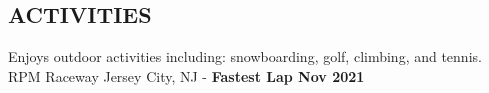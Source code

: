 \documentclass[margin,11pt]{res}
\begin{document}
\begin{resume}
\section{ACTIVITIES}
Enjoys outdoor activities including: snowboarding, golf, climbing, and tennis.\\
RPM Raceway Jersey City, NJ - \textbf{Fastest Lap Nov 2021}

\end{resume}
\end{document}
